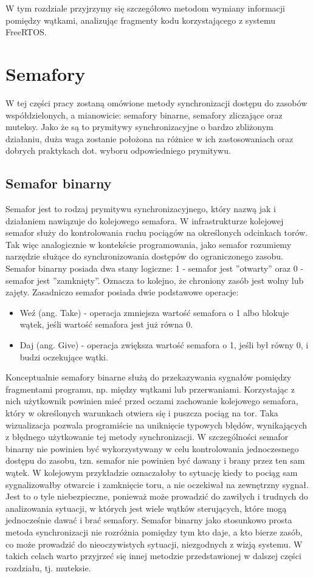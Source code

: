 W tym rozdziale przyjrzymy się szczegółowo metodom wymiany informacji pomiędzy wątkami,
analizując fragmenty kodu korzystającego z systemu FreeRTOS.

\section{Semafory}
W tej części pracy zostaną omówione metody synchronizacji dostępu do zasobów współdzielonych, a mianowicie: semafory binarne, semafory zliczające
oraz muteksy. Jako że są to prymitywy synchronizacyjne o bardzo zbliżonym działaniu, duża waga zostanie położona na różnice w ich zastosowaniach
oraz dobrych praktykach dot. wyboru odpowiedniego prymitywu.

\subsection{Semafor binarny}
Semafor jest to rodzaj prymitywu synchronizacyjnego, który nazwą jak i działaniem nawiązuje do kolejowego semafora. W infrastrukturze kolejowej
semafor służy do kontrolowania ruchu pociągów na określonych odcinkach torów. Tak więc analogicznie w kontekście programowania, jako semafor rozumiemy
narzędzie służące do synchronizowania dostępów do ograniczonego zasobu. Semafor binarny posiada dwa stany logiczne: 1 - semafor jest ''otwarty'' oraz
0 - semafor jest ''zamknięty''. Oznacza to kolejno, że chroniony zasób jest wolny lub zajęty.
Zasadniczo semafor posiada dwie podstawowe operacje:
\begin{itemize}
    \item Weź (ang. Take) - operacja zmniejsza wartość semafora o 1 albo blokuje wątek, jeśli wartość semafora jest już równa 0.
    \item Daj (ang. Give) - operacja zwiększa wartość semafora o 1, jeśli był równy 0, i budzi oczekujące wątki.
\end{itemize}

Konceptualnie semafory binarne służą do przekazywania sygnałów pomiędzy fragmentami programu, np. między wątkami lub przerwaniami.
Korzystając z nich użytkownik powinien mieć przed oczami zachowanie kolejowego semafora, który w określonych warunkach otwiera się
i puszcza pociąg na tor. Taka wizualizacja pozwala programiście na uniknięcie typowych błędów, wynikających z błędnego użytkowanie tej metody synchronizacji.
W szczególności semafor binarny nie powinien być wykorzystywany w celu kontrolowania jednoczesnego dostępu do zasobu,
tzn. semafor nie powinien być dawany i brany przez ten sam wątek. W kolejowym przykładzie oznaczałoby to sytuację kiedy to pociąg sam sygnalizowałby
otwarcie i zamknięcie toru, a nie oczekiwał na zewnętrzny sygnał. Jest to o tyle niebezpieczne, ponieważ może prowadzić do zawiłych i trudnych
do analizowania sytuacji, w których jest wiele wątków sterujących, które mogą jednocześnie dawać i brać semafory. Semafor binarny jako stosunkowo
prosta metoda synchronizacji nie rozróżnia pomiędzy tym kto daje, a kto bierze zasób, co może prowadzić do nieoczywistych sytuacji, niezgodnych z wizją
systemu. W takich celach warto przyjrzeć się innej metodzie przedstawionej w dalszej części rozdziału, tj. muteksie.

